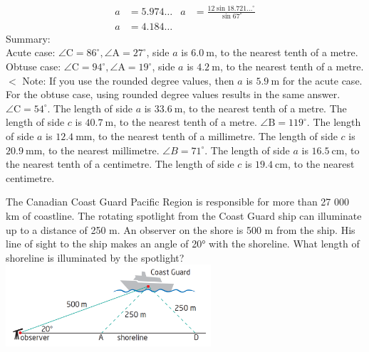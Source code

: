 \documentclass[12pt,fleqn]{book}
\newcommand{\prb}[1]{\begin{Exercise}\parbox[t]{\textwidth-5em}{#1}\end{Exercise}}
\begin{document}
{\begin{tasks}
\[\begin{array}{rlrl}
				a                                      & =5.974 \ldots                                             & a                                       & =\frac{12 \sin 18.721 \ldots{ }^{\circ}}{\sin 67^{\circ}} \\
				a                                      & =4.184 \ldots
			\end{array}
		\]
		Summary:\\
		Acute case: $\angle \mathrm{C}=86^{\circ}, \angle \mathrm{A}=27^{\circ}$, side $a$ is $6.0 \mathrm{~m}$, to the nearest tenth of a metre.
		Obtuse case: $\angle \mathrm{C}=94^{\circ}, \angle \mathrm{A}=19^{\circ}$, side $a$ is $4.2 \mathrm{~m}$, to the nearest tenth of a metre.
		$<$ Note: If you use the rounded degree values, then $a$ is $5.9 \mathrm{~m}$ for the acute case. For the obtuse case, using rounded degree values results in the same answer.
		\task
		$\angle \mathrm{C}=54^{\circ}$.
		The length of side $a$ is $33.6 \mathrm{~m}$, to the nearest tenth of a metre.
		The length of side $c$ is $40.7 \mathrm{~m}$, to the nearest tenth of a metre.
		\task
		$\angle \mathrm{B}=119^{\circ}$.
		The length of side $a$ is $12.4 \mathrm{~mm}$, to the nearest tenth of a millimetre.
		The length of side $c$ is $20.9 \mathrm{~mm}$, to the nearest millimetre.
		\task
		$\angle B=71^{\circ}$.
		The length of side $a$ is $16.5 \mathrm{~cm}$, to the nearest tenth of a centimetre.
		The length of side $c$ is $19.4 \mathrm{~cm}$, to the nearest centimetre.
	\end{tasks}
}
\prb{The Canadian Coast Guard Pacific Region is responsible for more than 27 000 km of coastline. The rotating spotlight from the Coast Guard ship can illuminate up to a distance of 250 m. An observer on the shore is 500 m from the ship. His line of sight to the ship makes an angle of 20° with the shoreline. What length of shoreline is illuminated by the spotlight?
	\includegraphics*[width=3in]{coastguard}
}
\end{document}
